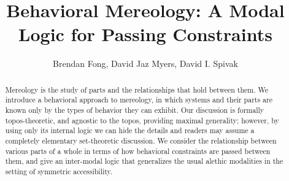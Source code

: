 \documentclass{article}
\title{Behavioral Mereology: A Modal Logic for Passing Constraints}
\author{Brendan Fong, David Jaz Myers, David I. Spivak}
\date{}
\begin{document}
\maketitle

\begin{abstract}
	Mereology is the study of parts and the relationships that hold between them. We introduce a behavioral approach to mereology, in which systems and their parts are known only by the types of behavior they can exhibit. Our discussion is formally topos-theoretic, and agnostic to the topos, providing maximal generality; however, by using only its internal logic we can hide the details and readers may assume a completely elementary set-theoretic discussion. We consider the relationship between various parts of a whole in terms of how behavioral constraints are passed between them, and give an inter-modal logic that generalizes the usual alethic modalities in the setting of symmetric accessibility.
\end{abstract}


\printbibliography
\end{document}
